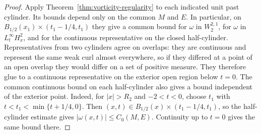 \documentclass[11pt,letterpaper]{article}
\numberwithin{equation}{section}
\theoremstyle{plain}
\theoremstyle{definition}
\theoremstyle{remark}
\begin{document}
\begin{proof}
Apply Theorem~\ref{thm:vorticity-regularity} to each indicated unit past
cylinder. Its bounds depend only on the common $M$ and $E$. In particular,
on $B_{1/2}(x_1)\times(t_1-1/4,t_1)$ they give a common bound for
$\omega$ in $W^{2,1}_2$, for $\omega$ in $L^\infty_tH^2_x$, and for the
continuous representative on the closed half-cylinder. Representatives
from two cylinders agree on overlaps: they are continuous and represent the
same weak curl almost everywhere, so if they differed at a point of an open
overlap they would differ on a set of positive measure. They therefore glue
to a continuous representative on the exterior open region below $t=0$.
The common continuous bound on each half-cylinder also gives a bound
independent of the exterior point. Indeed, for $|x|>R_2$ and $-2<t<0$,
choose $t_1$ with $t<t_1<\min\{t+1/4,0\}$. Then
$(x,t)\in B_{1/2}(x)\times(t_1-1/4,t_1)$, so the half-cylinder estimate
gives $|\omega(x,t)|\le C_0(M,E)$. Continuity up to $t=0$ gives the same
bound there.


\end{proof}
\end{document}
